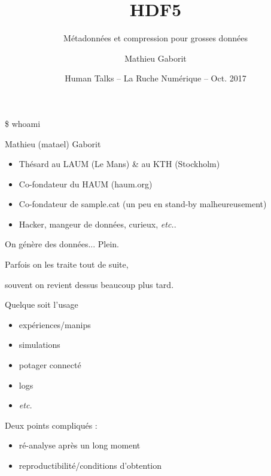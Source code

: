 \documentclass[10pt]{beamer}
\title{HDF5}
\subtitle{Métadonnées et compression pour grosses données}
\author{Mathieu Gaborit}
\date{Human Talks -- La Ruche Numérique -- Oct. 2017}
\institute{}
\newcommand\etc{\textit{etc.}}
\begin{document}
\maketitle


\begin{frame}{\$ whoami}
	\begin{center}
		Mathieu (matael) Gaborit
	\end{center}

	\begin{itemize}
		\item Thésard au LAUM (Le Mans) \& au KTH (Stockholm)
		\item Co-fondateur du HAUM (\alert{haum.org})
		\item Co-fondateur de \alert{sample.cat} (un peu en stand-by malheureusement)
		\item Hacker, mangeur de données, curieux, \etc.
	\end{itemize}
\end{frame}

\begin{frame}[standout]
	On génère des données... Plein.

	\pause

	Parfois on les traite tout de suite,

	\pause
	souvent on revient dessus beaucoup plus tard.
\end{frame}

\begin{frame}{Quelque soit l'usage}

	\begin{itemize}
		\item expériences/manips
		\item simulations
		\item potager connecté
		\item logs
		\item \etc
	\end{itemize}

	\pause

	Deux points compliqués :

	\begin{itemize}
		\item ré-analyse après un long moment
		\item reproductibilité/conditions d'obtention
	\end{itemize}
\end{frame}
\end{document}
